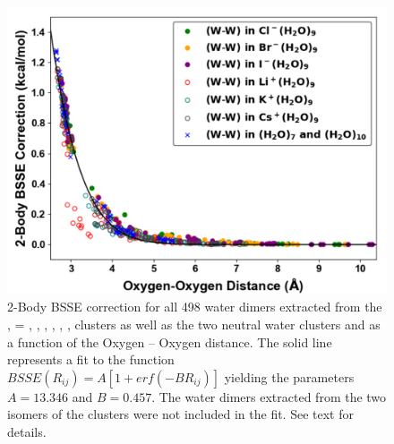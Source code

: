 \begin{figure}[h]
\uwsinglespace
\centering
\includegraphics[width=.8\textwidth]{Figures/Chapter_3/figure_10.pdf}
\caption[2-Body BSSE correction for all 498 water dimers extracted from the ,  = , , , , , , clusters as well as the two neutral water clusters  and  as a function of the Oxygen – Oxygen distance.]{2-Body BSSE correction for all 498 water dimers extracted from the ,  = , , , , , , clusters as well as the two neutral water clusters  and  as a function of the Oxygen – Oxygen distance. The solid line represents a fit to the function $BSSE(R_{ij})=A[1+erf(-BR_{ij})]$ yielding the parameters $A = 13.346$ and $B = 0.457$. The water dimers extracted from the two isomers of the  clusters were not included in the fit. See text for details.}
\label{fig:MBE_II_10}
\end{figure}